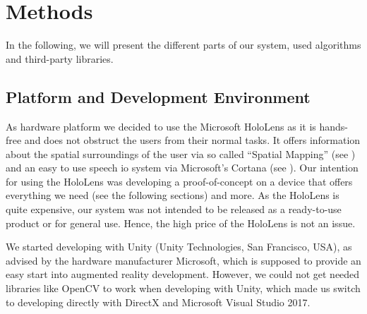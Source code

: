 
\section{Methods}
In the following, we will present the different parts of our system, used algorithms and third-party libraries.


\subsection{Platform and Development Environment}
\label{subsec:sucks}
As  hardware platform we decided to use the Microsoft HoloLens as it is hands-free and does not obstruct the users from their normal tasks.
It offers information about the spatial surroundings of the user via so called \enquote{Spatial Mapping} (see ) and an easy to use speech \ac{io} system via Microsoft's Cortana (see ).
Our intention for using the HoloLens was developing a proof-of-concept on a device that offers everything we need (see the following sections) and more.
As the HoloLens is 	quite expensive, our system was not intended to be released as a ready-to-use product or for general use.
Hence, the high price of the HoloLens is not an issue.

We started developing with Unity (Unity Technologies, San Francisco, USA), as advised by the hardware manufacturer Microsoft, which is supposed to provide an  easy start into augmented reality development.
However, we could not get needed libraries like OpenCV to work when developing with Unity, which made us switch to developing directly with DirectX and Microsoft Visual Studio 2017.


